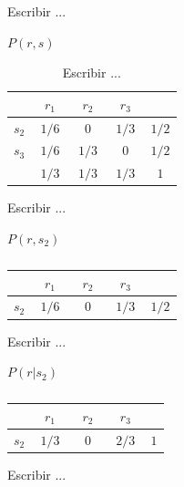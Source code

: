 \documentclass[a4paper,10pt]{book}
\begin{document}
Escribir ...

\begin{table}[H]
\centering
$P(r,s)$ \\ \vspace{0.3cm}
 \begin{tabular}{c|c|c|c||c} \setlength\tabcolsep{0.4cm} 
        & \, $r_1$ \, &  \, $r_2$ \, & \, $r_3$ \, & \\ \hline 
  { $s_2$}  & {$1/6$} & {$0$} & {$1/3$} & {$1/2$} \\ \hline
       {$s_3$} & {$1/6$} & {$1/3$} & {$0$} & {$1/2$} \\ \hline
              & {$1/3$} & {$1/3$} & {$1/3$}  & {$1$} \\ 
\end{tabular}
\caption{Escribir ...}
\label{tab:monty_hall_conjunta_y_marginal}
\end{table}

Escribir ...

\begin{table}[H]
 \centering
$P(r,s_2)$ \\ \vspace{0.3cm}
 \begin{tabular}{c|c|c|c||c} \setlength\tabcolsep{0.4cm} 
        & \, $r_1$ \, &  \, $r_2$ \, & \, $r_3$ \, & \\ \hline 
        { $s_2$}  & {$1/6$} & {$0$} & {$1/3$} & {$1/2$} \\ \hline
\end{tabular}
\caption{}
\label{tab:monty_hall_conjunta_compatible}
\end{table}

Escribir ...

\begin{table}[H]
 \centering
$P(r|s_2)$ \\ \vspace{0.3cm}
 \begin{tabular}{c|c|c|c||c} \setlength\tabcolsep{0.4cm} 
        & \, $r_1$ \, &  \, $r_2$ \, & \, $r_3$ \, & \phantom{$1/2$}\\ \hline 
  { $s_2$}  & {$1/3$} & {$0$} & {$2/3$} & {$1$} \\ \hline
\end{tabular}
\caption{}
\label{tab:monty_hall_condicional}
\end{table}

Escribir ...
\end{document}

